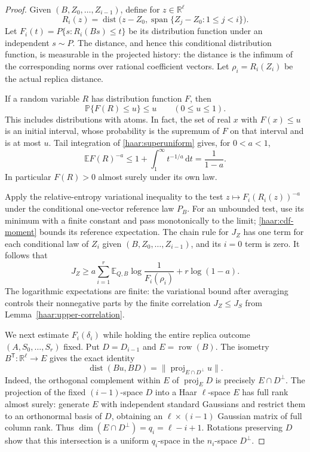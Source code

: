 \begin{proof}
Given $(B,Z_0,\ldots,Z_{i-1})$, define for $z\in\mathbb R^\ell$
\[
 R_i(z)=\operatorname{dist}\bigl(z-Z_0,
             \operatorname{span}\{Z_j-Z_0:1\le j<i\}\bigr).
\]
Let $F_i(t)=P\{s:R_i(Bs)\le t\}$ be its distribution function under
an independent $s\sim P$.
The distance, and hence this conditional distribution function, is
measurable in the projected history: the distance is the infimum of
the corresponding norms over rational coefficient vectors.  Let
$\rho_i=R_i(Z_i)$ be the actual replica distance.

If a random variable $R$ has distribution function $F$, then
\begin{equation}\label{haar:superuniform}
 \mathbb P\{F(R)\le u\}\le u\qquad(0\le u\le1).
\end{equation}
This includes distributions with atoms.  In fact, the set of real $x$
with $F(x)\le u$ is an initial interval, whose probability is the
supremum of $F$ on that interval and is at most $u$.  Tail integration
of \eqref{haar:superuniform} gives, for $0<a<1$,
\begin{equation}\label{haar:cdf-moment}
 \mathbb E F(R)^{-a}
 \le1+\int_1^\infty t^{-1/a}\,\mathrm dt=\frac1{1-a}.
\end{equation}
In particular $F(R)>0$ almost surely under its own law.

Apply the relative-entropy variational inequality to the test
$z\mapsto F_i(R_i(z))^{-a}$ under the conditional one-vector reference
law $P_B$.
For an unbounded test, use its minimum with a finite constant and pass
monotonically to the limit; \eqref{haar:cdf-moment} bounds its reference
expectation.  The chain rule for $J_Z$ has one term for each conditional
law of $Z_i$ given $(B,Z_0,\ldots,Z_{i-1})$, and its $i=0$ term is zero.
It follows that
\begin{equation}\label{haar:cdf-test}
 J_Z\ge a\sum_{i=1}^r\mathbb E_{Q,B}\log\frac1{F_i(\rho_i)}
             +r\log(1-a).
\end{equation}
The logarithmic expectations are finite: the variational bound after
averaging controls their nonnegative parts by the finite correlation
$J_Z\le J_S$ from Lemma~\ref{haar:upper-correlation}.

We next estimate $F_i(\delta_i)$ while holding the entire replica
outcome $(A,S_0,\ldots,S_r)$ fixed.  Put $D=D_{i-1}$ and
$E=\operatorname{row}(B)$.  The isometry $B^{\mathsf T}:\mathbb R^\ell
\to E$ gives the exact identity
\begin{equation}\label{haar:intersection}
 \operatorname{dist}(Bu,BD)
       =\lVert\operatorname{proj}_{E\cap D^\perp}u\rVert.
\end{equation}
Indeed, the orthogonal complement within $E$ of
$\operatorname{proj}_E D$ is precisely $E\cap D^\perp$.
The projection of the fixed $(i-1)$-space $D$ into a Haar $\ell$-space
$E$ has full rank almost surely: generate $E$ with independent standard
Gaussians and restrict them to an orthonormal basis of $D$, obtaining an
$\ell\times(i-1)$ Gaussian matrix of full column rank.  Thus
$\dim(E\cap D^\perp)=q_i=\ell-i+1$.  Rotations preserving $D$ show
that this intersection is a uniform $q_i$-space in the $n_i$-space
$D^\perp$.


\end{proof}
